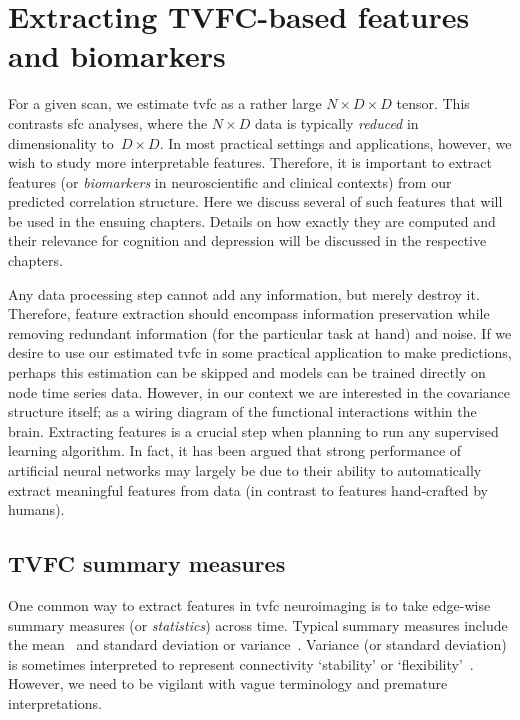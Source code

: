 \clearpage
\section{Extracting TVFC-based features and biomarkers}
\label{sec:tvfc-feature-extraction}

For a given scan, we estimate \gls{tvfc} as a rather large $N \times D \times D$ tensor.
This contrasts \gls{sfc} analyses, where the $N \times D$ data is typically \emph{reduced} in dimensionality to~$D \times D$.
%
In most practical settings and applications, however, we wish to study more interpretable features.
Therefore, it is important to extract features (or \emph{biomarkers} in neuroscientific and clinical contexts) from our predicted correlation structure.
Here we discuss several of such features that will be used in the ensuing chapters.
Details on how exactly they are computed and their relevance for cognition and depression will be discussed in the respective chapters.

Any data processing step cannot add any information, but merely destroy it.
Therefore, feature extraction should encompass information preservation while removing redundant information (for the particular task at hand) and noise.
If we desire to use our estimated \gls{tvfc} in some practical application to make predictions, perhaps this estimation can be skipped and models can be trained directly on node time series data.
However, in our context we are interested in the covariance structure itself; as a wiring diagram of the functional interactions within the brain.
%
Extracting features is a crucial step when planning to run any supervised learning algorithm.
In fact, it has been argued that strong performance of artificial neural networks may largely be due to their ability to automatically extract meaningful features from data (in contrast to features hand-crafted by humans).

\subsection{TVFC summary measures}
\label{subsec:tvfc-summary-measures}

One common way to extract features in \gls{tvfc} neuroimaging is to take edge-wise summary measures (or \emph{statistics}) across time.
%
Typical summary measures include the mean~\parencite[analogous to \gls{sfc} estimates; sometimes considered the connection `strength', see e.g.][]{Choe2017} and standard deviation or variance~\parencite[see e.g.][]{Chang2010, Hutchison2013b, Kucyi2013, Kucyi2014, Kaiser2015, Demirtas2016, Choe2017}.
Variance (or standard deviation) is sometimes interpreted to represent connectivity `stability' or `flexibility'~\parencite[see e.g.][]{Allen2014}.
However, we need to be vigilant with vague terminology and premature interpretations.


